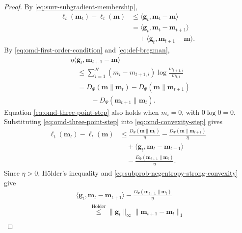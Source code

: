 \documentclass[journal]{IEEEtran}
\theoremstyle{remark}
\begin{document}
\begin{proof}
By \eqref{eq:surr-subgradient-membership},
\begin{equation}
\label{eq:omd-convexity-step}
\begin{aligned}
\ell_t(\mathbf{m}_t)-\ell_t(\mathbf{m})
&\le
\langle \mathbf{g}_t,\mathbf{m}_t-\mathbf{m}\rangle \\
&=
\langle \mathbf{g}_t,\mathbf{m}_t-\mathbf{m}_{t+1}\rangle \\
&\quad+
\langle \mathbf{g}_t,\mathbf{m}_{t+1}-\mathbf{m}\rangle.
\end{aligned}
\end{equation}
By \eqref{eq:omd-first-order-condition} and \eqref{eq:def-bregman},
\begin{equation}
\label{eq:omd-three-point-step}
\begin{aligned}
&\eta\langle \mathbf{g}_t,\mathbf{m}_{t+1}-\mathbf{m}\rangle \\
&\quad\le\sum_{i=1}^H(m_i-m_{t+1,i})
\log\frac{m_{t+1,i}}{m_{t,i}}\\
&\quad=
D_\Psi(\mathbf{m}\|\mathbf{m}_t)
-D_\Psi(\mathbf{m}\|\mathbf{m}_{t+1}) \\
&\qquad\quad
-D_\Psi(\mathbf{m}_{t+1}\|\mathbf{m}_t).
\end{aligned}
\end{equation}
Equation \eqref{eq:omd-three-point-step} also holds when $m_i=0$, with
$0\log0=0$.
Substituting \eqref{eq:omd-three-point-step} into
\eqref{eq:omd-convexity-step} gives
\begin{equation}
\label{eq:omd-one-step-regret}
\begin{aligned}
\ell_t(\mathbf{m}_t)-\ell_t(\mathbf{m})
&\le
\frac{D_\Psi(\mathbf{m}\|\mathbf{m}_t)}{\eta}
-\frac{D_\Psi(\mathbf{m}\|\mathbf{m}_{t+1})}{\eta} \\
&\quad+
\langle \mathbf{g}_t,\mathbf{m}_t-\mathbf{m}_{t+1}\rangle
\\
&\quad
-\frac{D_\Psi(\mathbf{m}_{t+1}\|\mathbf{m}_t)}{\eta}.
\end{aligned}
\end{equation}
Since $\eta>0$, H\"older's inequality and
\eqref{eq:subprob-negentropy-strong-convexity} give
\begin{equation}
\label{eq:omd-young-step}
\begin{aligned}
&\langle \mathbf{g}_t,\mathbf{m}_t-\mathbf{m}_{t+1}\rangle
-\frac{D_\Psi(\mathbf{m}_{t+1}\|\mathbf{m}_t)}{\eta} \\
&\qquad\overset{\text{H\"older}}{\le}
\|\mathbf{g}_t\|_\infty\|\mathbf{m}_{t+1}-\mathbf{m}_t\|_1\\

\end{aligned}
\end{equation}
\end{proof}
\end{document}
